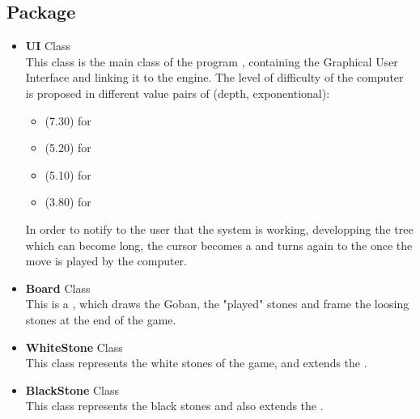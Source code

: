 \documentclass[a4paper,10pt]{report}
\newcommand{\empha}[1]{\textbf{\color{blue}{#1}}}
\begin{document}
			\subsection{Package \empha{ui}}
			\begin{itemize}

				\item \textbf{UI} Class\\
This class is the main class of the \empha{Java} program \empha{Atari-Go game}, containing the Graphical User Interface and linking it to the \empha{Arficial Inteligence} engine.
The level of difficulty of the computer is proposed in different value pairs of (depth, exponentional):
					\begin{itemize}
						\item (7.30) for \empha{Hard}
						\item (5.20) for \empha{Medium}
						\item (5.10) for \empha{Easy}
						\item (3.80) for \empha{Very Easy}
					\end{itemize}
In order to notify to the user that the system is working, developping the \empha{Min-Max} tree which can become long, the cursor becomes a \empha{Wait\_Cursor} and turns again to the \empha{Default} once the move is played by the computer.

				\item \textbf{Board} Class\\
This is a \empha{Java Canvas}, which draws the Goban, the "played" stones and frame the loosing stones at the end of the game.

				\item \textbf{WhiteStone} Class\\
This class represents the white stones of the \empha{Atari-Go} game, and extends the \empha{Java Canvas}.

				\item \textbf{BlackStone} Class\\
This class represents the black stones and also extends the \empha{Java Canvas}.

			\end{itemize}
\end{document}
